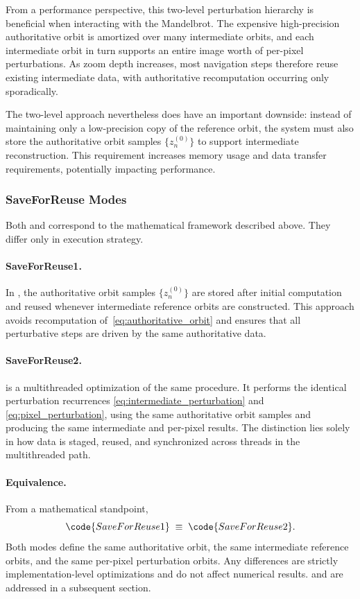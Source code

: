 From a performance perspective, this two-level perturbation hierarchy is
beneficial when interacting with the Mandelbrot. The expensive high-precision
authoritative orbit is amortized over many intermediate orbits, and each
intermediate orbit in turn supports an entire image worth of per-pixel
perturbations. As zoom depth increases, most navigation steps therefore reuse
existing intermediate data, with authoritative recomputation occurring only
sporadically.

The two-level approach nevertheless does have an important downside: instead of
maintaining only a low-precision copy of the reference orbit, the system must also
store the authoritative orbit samples $\{z^{(0)}_n\}$ to support intermediate
reconstruction.  This requirement increases memory usage and data transfer requirements,
potentially impacting performance.

\subsubsection{SaveForReuse Modes}

Both  and  correspond to the mathematical framework described above.
They differ only in execution strategy.

\paragraph{SaveForReuse1.}
In , the authoritative orbit samples $\{z^{(0)}_n\}$ are stored after initial computation and reused
whenever intermediate reference orbits are constructed.
This approach avoids recomputation of~\eqref{eq:authoritative_orbit} and ensures that all perturbative steps are driven by the same
authoritative data.

\paragraph{SaveForReuse2.}
 is a multithreaded optimization of the same procedure.
It performs the identical perturbation recurrences
\eqref{eq:intermediate_perturbation} and \eqref{eq:pixel_perturbation}, using the same authoritative orbit samples and
producing the same intermediate and per-pixel results.
The distinction lies solely in how data is staged, reused, and synchronized across threads in the multithreaded path.

\paragraph{Equivalence.}
From a mathematical standpoint,
\[
\code{SaveForReuse1} \;\equiv\; \code{SaveForReuse2}.
\]
Both modes define the same authoritative orbit, the same intermediate reference
orbits, and the same per-pixel perturbation orbits.
Any differences are strictly implementation-level optimizations and do not affect numerical results.
 and  are addressed in a subsequent section.

